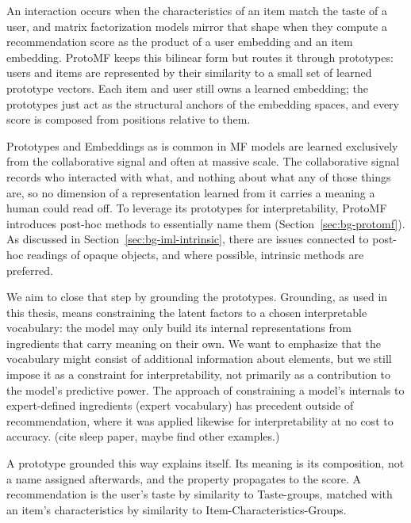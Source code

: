 
An interaction occurs when the characteristics of an item match the taste of a
user, and matrix factorization models mirror that shape when they compute a
recommendation score as the product of a user embedding and an item embedding.
ProtoMF keeps this bilinear form but routes it through prototypes: users and
items are represented by their similarity to a small set of learned prototype
vectors. Each item and user still owns a learned embedding; the prototypes
just act as the structural anchors of the embedding spaces, and every score is
composed from positions relative to them.

Prototypes and Embeddings as is common in MF models are learned exclusively
from the collaborative signal and often at massive scale. The collaborative
signal records who interacted with what, and nothing about what any of those
things are, so no dimension of a representation learned from it carries a
meaning a human could read off. To leverage its prototypes for
interpretability, ProtoMF introduces post-hoc methods to essentially name them
(Section~\ref{sec:bg-protomf}). As discussed in
Section~\ref{sec:bg-iml-intrinsic}, there are issues connected to post-hoc
readings of opaque objects, and where possible, intrinsic methods are
preferred.

We aim to close that step by grounding the prototypes. Grounding, as used in
this thesis, means constraining the latent factors to a chosen interpretable
vocabulary: the model may only build its internal representations from
ingredients that carry meaning on their own. We want to emphasize that the
vocabulary might consist of additional information about elements, but we
still impose it as a constraint for interpretability, not primarily as a
contribution to the model's predictive power. The approach of constraining a
model's internals to expert-defined ingredients (expert vocabulary) has
precedent outside of recommendation, where it was applied likewise for
interpretability at no cost to accuracy. (cite sleep paper, maybe find other
examples.)

A prototype grounded this way explains itself. Its meaning is its composition,
not a name assigned afterwards, and the property propagates to the score. A
recommendation is the user's taste by similarity to Taste-groups, matched with
an item's characteristics by similarity to Item-Characteristics-Groups.

